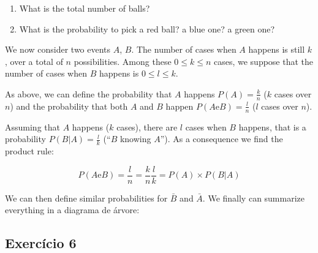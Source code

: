 \begin{enumerate}
\item What is the total number of balls?
\item What is the probability to pick a red ball? a blue one? a green one?
\end{enumerate}

We now consider two events $A$, $B$. The number of cases when $A$ happens is
still $k$, over a total of $n$ possibilities. Among these $0 \leq k \leq n$
cases, we suppose that the number of cases when $B$ happens is
$0 \leq l \leq k$.

As above, we can define the probability
that $A$ happens $P{(A)} = \frac{k}{n}$ ($k$ cases over $n$) and the
probability that both $A$ and $B$ happen
$P{(A \text{e} B)} = \frac{l}{n}$ ($l$ cases over $n$).

Assuming that $A$ happens ($k$ cases), there are $l$ cases when $B$ happens,
that is a probability $P{(B|A)} = \frac{l}{k}$ (``$B$ knowing $A$''). As
a consequence we find the product rule:

$$P{(A \text{e} B)} = \frac{l}{n} = {\frac{k}{n} \frac{l}{k}} =
{P{(A)} \times P{(B|A)}}$$

We can then define similar probabilities for $\bar{B}$ and $\bar{A}$. We finally
can summarize everything in a diagrama de árvore:

\begin{center}
\end{center}

\subsection*{Exercício 6}

